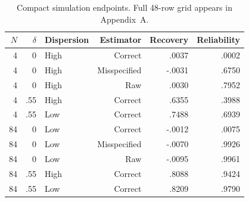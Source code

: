 \begin{table}[tbp]
\centering
\caption{Compact simulation endpoints. Full 48-row grid appears in Appendix~A.}
\label{tab:simulation-endpoints}
\small
\begin{tabular}{rrlrrr}
\toprule
$N$ & $\delta$ & Dispersion & Estimator & Recovery & Reliability \\
\midrule
4 & 0 & High & Correct & .0037 & .0002 \\
4 & 0 & High & Misspecified & -.0031 & .6750 \\
4 & 0 & High & Raw & .0030 & .7952 \\
4 & .55 & High & Correct & .6355 & .3988 \\
4 & .55 & Low & Correct & .7488 & .6939 \\
84 & 0 & Low & Correct & -.0012 & .0075 \\
84 & 0 & Low & Misspecified & -.0070 & .9926 \\
84 & 0 & Low & Raw & -.0095 & .9961 \\
84 & .55 & High & Correct & .8088 & .9424 \\
84 & .55 & Low & Correct & .8209 & .9790 \\
\bottomrule
\end{tabular}
\end{table}

